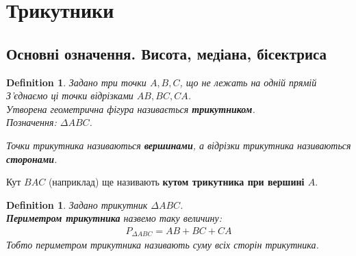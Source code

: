 \documentclass[a4paper, 10pt]{article}
\theoremstyle{theoremdd}
\theoremstyle{theoremdd}
\theoremstyle{theoremdd}
\newtheorem{definition}[theorem]{Definition}
\theoremstyle{theoremdd}
\theoremstyle{theoremdd}
\theoremstyle{theoremdd}
\theoremstyle{theoremdd}
\theoremstyle{theoremdd}
\theoremstyle{theoremdd}
\begin{document}
\section{Трикутники}
\subsection{Основні означення. Висота, медіана, бісектриса}
\begin{definition}
Задано три точки $A,B,C$, що не лежать на одній прямій З'єднаємо ці точки відрізками $AB,BC,CA$.\\
Утворена геометрична фігура називається \textbf{трикутником}.\\
Позначення: $\Delta ABC$.
\begin{figure}[H]
\centering
{}
\end{figure}
Точки трикутника називаються \textbf{вершинами}, а відрізки трикутника називаються \textbf{сторонами}.
\end{definition}

Кут $BAC$ (наприклад) ще називають \textbf{кутом трикутника при вершині $A$}.

\begin{definition} Задано трикутник $\Delta ABC$.\\
\textbf{Периметром трикутника} назвемо таку величину:
\begin{align*}
P_{\Delta ABC} = AB + BC + CA
\end{align*}
Тобто периметром трикутника називають суму всіх сторін трикутника.
\end{definition}

\end{document}
